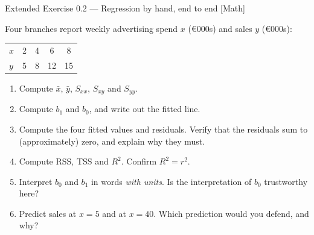 \documentclass[aspectratio=169,11pt]{beamer}
\begin{document}
\begin{frame}{Extended Exercise 0.2 --- Regression by hand, end to end [Math]}
  \begin{longexercise}
    Four branches report weekly advertising spend $x$ (\euro 000s) and sales
    $y$ (\euro 000s):
    \begin{center}\footnotesize
    \begin{tabular}{@{}lcccc@{}}
      \toprule
      $x$ & 2 & 4 & 6 & 8 \\
      $y$ & 5 & 8 & 12 & 15 \\
      \bottomrule
    \end{tabular}
    \end{center}
    \begin{enumerate}
      \item Compute $\bar x$, $\bar y$, $S_{xx}$, $S_{xy}$ and $S_{yy}$.
      \item Compute $b_1$ and $b_0$, and write out the fitted line.
      \item Compute the four fitted values and residuals. Verify that the
            residuals sum to (approximately) zero, and explain why they must.
      \item Compute RSS, TSS and $R^2$. Confirm $R^2 = r^2$.
      \item Interpret $b_0$ and $b_1$ in words \emph{with units}. Is the
            interpretation of $b_0$ trustworthy here?
      \item Predict sales at $x = 5$ and at $x = 40$. Which prediction would
            you defend, and why?
    \end{enumerate}
  \end{longexercise}
\end{frame}
\end{document}

